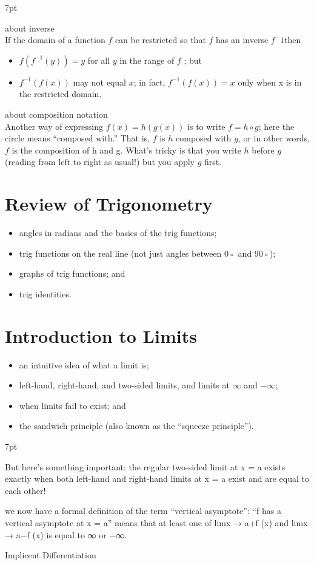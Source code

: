 \documentclass{book}
\newenvironment{formal4}{%
\def\FrameCommand{%
\hspace{1pt}%
{\color{SkyBlue}\vrule width 2pt}%
{\color{Cyan1}\vrule width 4pt}%
\colorbox{LightCyan1}%
}%
\MakeFramed{\advance\hsize-\width\FrameRestore}%
\noindent\hspace{-4.55pt}%
\begin{adjustwidth}{}{7pt}%
\vspace{2pt}\vspace{2pt}%
}
{%
\vspace{2pt}\end{adjustwidth}\endMakeFramed%
}
\newenvironment{formal5}{%
\def\FrameCommand{%
\hspace{1pt}%
{\color{HotPink}\vrule width 2pt}%
{\color{LightPink}\vrule width 4pt}%
\colorbox{MistyRose}%
}%
\MakeFramed{\advance\hsize-\width\FrameRestore}%
\noindent\hspace{-4.55pt}%
\begin{adjustwidth}{}{7pt}%
\vspace{2pt}\vspace{2pt}%
}
{%
\vspace{2pt}\end{adjustwidth}\endMakeFramed%
}
\begin{document}
\begin{formal4}
about inverse\\    
If the domain of a function $f$ can be restricted so that $f$ has an inverse
$f^-1$then
\begin{itemize}
\item $f (f ^{−1}(y)) = y$ for all $y$ in the range of $f$ ; but
\item $f ^{−1}(f (x))$ may not equal $x$; in fact, $f ^{−1}(f (x)) = x$ only when x is in
the restricted domain.\\
\end{itemize}
about composition notation\\
Another way of expressing $f (x) = h(g(x))$ is
to write $f = h \circ g$; here the circle means “composed with.” That is, $f$ is $h$
composed with $g$, or in other words, $f$ is the composition of h and g. What’s
tricky is that you write $h$ before $g$ (reading from left to right as usual!) but
you apply $g$ first.
\end{formal4}

\section{Review of Trigonometry}
\begin{itemize}
    \item angles in radians and the basics of the trig functions;
    \item trig functions on the real line (not just angles between 0◦ and 90◦);    
    \item graphs of trig functions; and
    \item trig identities.
\end{itemize}

\section{Introduction to Limits}
\begin{itemize}
    \item an intuitive idea of what a limit is;
    \item left-hand, right-hand, and two-sided limits, and limits at $\infty$ and $-\infty$;
    \item when limits fail to exist; and
    \item the sandwich principle (also known as the “squeeze principle”).
\end{itemize}
\begin{formal5}

But here’s something important: the regular two-sided limit at x = a exists exactly
when both left-hand and right-hand limits at x = a exist and are equal to
each other!

we now have a formal definition of the
term “vertical asymptote”:
“f has a vertical asymptote at x = a” means that at least one
of limx → a+f (x) and limx → a−f (x) is equal to ∞ or −∞.

\end{formal5}

Implicent Differentiation
\end{document}
